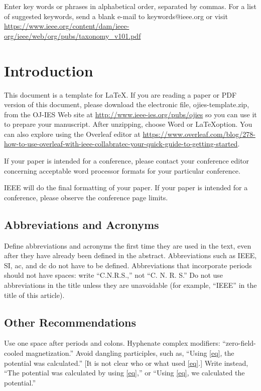 \documentclass{ieeeojies}
\begin{document}
\begin{keywords}
Enter key words or phrases in alphabetical 
order, separated by commas. For a list of suggested keywords, send a blank 
e-mail to keywords@ieee.org or visit \underline
{https://www.ieee.org/content/dam/ieee-org/ieee/web/org/pubs/taxonomy\_v101.pdf}
\end{keywords}

\titlepgskip=-15pt

\maketitle

\section{Introduction}
\label{sec:introduction}
This document is a template for \LaTeX. If you are 
reading a paper or PDF version of this document, please download the 
electronic file, ojies-template.zip, from the OJ-IES Web site at \underline
{http://www.ieee-ies.org/pubs/ojies} so you can use it to prepare your manuscript. After unzipping, choose Word or \LaTeX option. You can also explore using the Overleaf editor at 
\underline
{https://www.overleaf.com/blog/278-how-to-use-overleaf-}\break\underline{with-ieee-collabratec-your-quick-guide-to-getting-started}.

If your paper is intended for a conference, please contact your conference 
editor concerning acceptable word processor formats for your particular 
conference. 

IEEE will do the final formatting of your paper. If your paper is intended 
for a conference, please observe the conference page limits. 

\subsection{Abbreviations and Acronyms}
Define abbreviations and acronyms the first time they are used in the text, 
even after they have already been defined in the abstract. Abbreviations 
such as IEEE, SI, ac, and dc do not have to be defined. Abbreviations that 
incorporate periods should not have spaces: write ``C.N.R.S.,'' not ``C. N. 
R. S.'' Do not use abbreviations in the title unless they are unavoidable 
(for example, ``IEEE'' in the title of this article).

\subsection{Other Recommendations}
Use one space after periods and colons. Hyphenate complex modifiers: 
``zero-field-cooled magnetization.'' Avoid dangling participles, such as, 
``Using \eqref{eq}, the potential was calculated.'' [It is not clear who or what 
used \eqref{eq}.] Write instead, ``The potential was calculated by using \eqref{eq},'' or 
``Using \eqref{eq}, we calculated the potential.''
\end{document}
